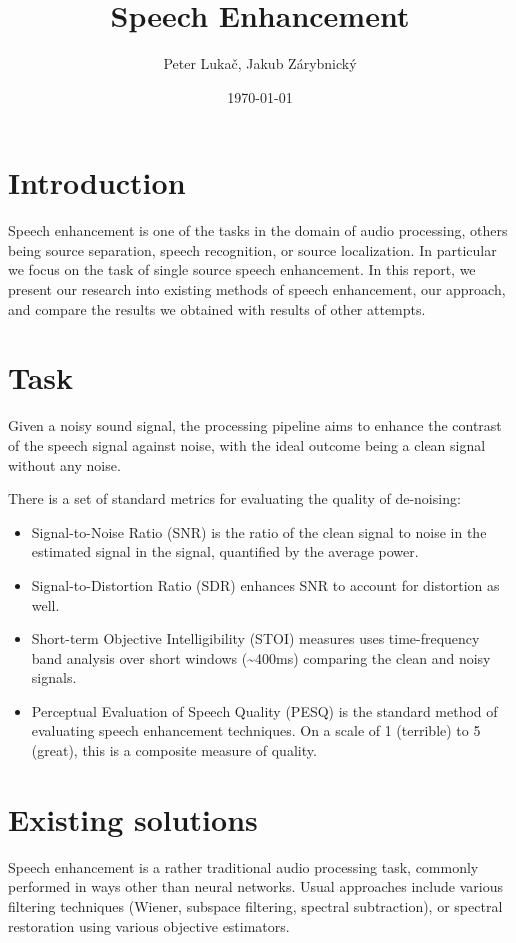 \documentclass[11pt]{article}
\author{Peter Lukač, Jakub Zárybnický}
\date{\today}
\title{Speech Enhancement}
\begin{document}
\maketitle

\section{Introduction}
\label{sec:orgeca9cd3}
Speech enhancement is one of the tasks in the domain of audio processing, others
being source separation, speech recognition, or source localization. In
particular we focus on the task of single source speech enhancement. In this
report, we present our research into existing methods of speech enhancement, our
approach, and compare the results we obtained with results of other attempts.

\section{Task}
\label{sec:org8c8b9f0}
Given a noisy sound signal, the processing pipeline aims to enhance the contrast
of the speech signal against noise, with the ideal outcome being a clean signal
without any noise.

There is a set of standard metrics for evaluating the quality of de-noising:
\begin{itemize}
\item Signal-to-Noise Ratio (SNR) is the ratio of the clean signal to noise in the
estimated signal in the signal, quantified by the average power.

\item Signal-to-Distortion Ratio (SDR) enhances SNR to account for distortion as well.

\item Short-term Objective Intelligibility (STOI) measures uses time-frequency band
analysis over short windows (\textasciitilde{}400ms) comparing the clean and noisy signals.

\item Perceptual Evaluation of Speech Quality (PESQ) is the standard method of
evaluating speech enhancement techniques. On a scale of 1 (terrible) to 5
(great), this is a composite measure of quality.
\end{itemize}

\section{Existing solutions}
\label{sec:orgfc9962a}
Speech enhancement is a rather traditional audio processing task, commonly
performed in ways other than neural networks. Usual approaches include various
filtering techniques (Wiener, subspace filtering, spectral subtraction), or
spectral restoration using various objective estimators.
\end{document}
